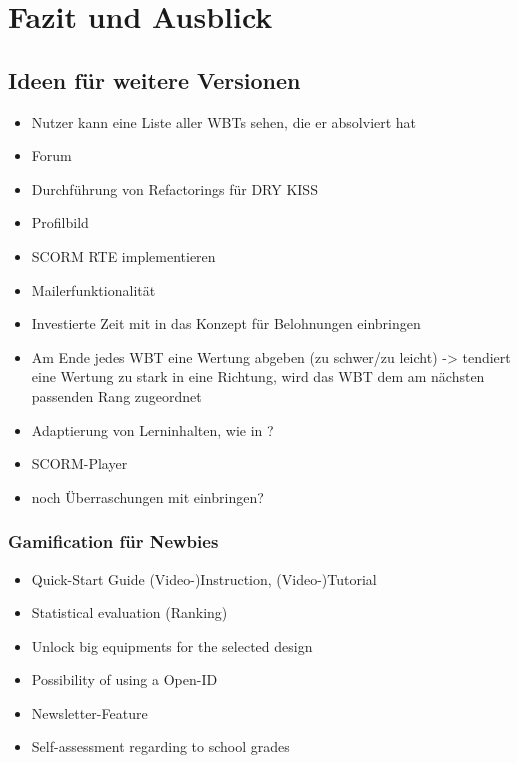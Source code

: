 \chapter{Fazit und Ausblick}\label{ref:chaptSummary}

\section{Ideen für weitere Versionen}\label{ref:weitereIdeen}
\begin{k}
\begin{itemize}
  \item Nutzer kann eine Liste aller WBTs sehen, die er absolviert hat
  \item Forum
  \item Durchführung von Refactorings für DRY KISS
  \item Profilbild
  \item SCORM RTE implementieren
  \item Mailerfunktionalität
  \item Investierte Zeit mit in das Konzept für Belohnungen einbringen
  \item Am Ende jedes WBT eine Wertung abgeben (zu schwer/zu leicht) -> tendiert
  eine Wertung zu stark in eine Richtung, wird das WBT dem am nächsten passenden
  Rang zugeordnet
  \item Adaptierung von Lerninhalten, wie in \cite{knall:2005}?
  \item SCORM-Player \cite{mitter:2005}
  \item noch Überraschungen mit einbringen? \cite{korte:2009}
\end{itemize}

\subsection{Gamification für Newbies}
\begin{itemize}
    \item Quick-Start Guide (Video-)Instruction, (Video-)Tutorial
    \item Statistical evaluation (Ranking)
    \item Unlock big equipments for the selected design
    \item Possibility of using a Open-ID
    \item Newsletter-Feature
    \item Self-assessment regarding to school grades
  \end{itemize}
  

\end{k}
